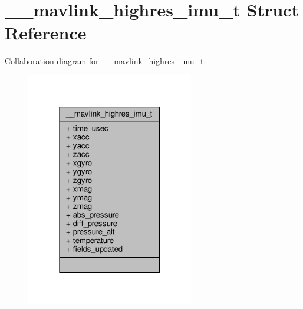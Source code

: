 \hypertarget{struct____mavlink__highres__imu__t}{\section{\+\_\+\+\_\+mavlink\+\_\+highres\+\_\+imu\+\_\+t Struct Reference}
\label{struct____mavlink__highres__imu__t}
}


Collaboration diagram for \+\_\+\+\_\+mavlink\+\_\+highres\+\_\+imu\+\_\+t\+:
\nopagebreak
\begin{figure}[H]
\begin{center}
\leavevmode
\includegraphics[width=207pt]{struct____mavlink__highres__imu__t__coll__graph}
\end{center}
\end{figure}
